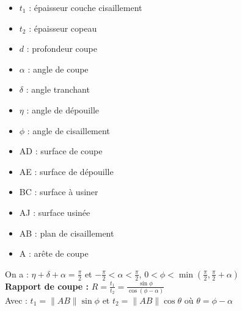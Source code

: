 \documentclass[../main.tex]{subfiles}
\begin{document}
\begin{minipage}{.5\textwidth}
    \begin{itemize}
        \item $t_1$ : épaisseur couche cisaillement\\
        \item $t_2$ : épaisseur copeau\\
        \item $d$ : profondeur coupe\\
        \item $\alpha$ : angle de coupe\\
        \item $\delta$ : angle tranchant\\
        \item $\eta$ : angle de dépouille\\
        \item $\phi$ : angle de cisaillement\\
    \end{itemize}
\end{minipage}
\begin{minipage}{.5\textwidth}
    \begin{itemize}
        \item AD : surface de coupe\\
        \item AE : surface de dépouille\\
        \item BC : surface à usiner\\
        \item AJ : surface usinée\\
        \item AB : plan de cisaillement\\
        \item A : arête de coupe\\
    \end{itemize}
\end{minipage}

On a : $\eta + \delta + \alpha = \frac{\pi}{2}$ et $-\frac{\pi}{2}<\alpha<\frac{\pi}{2}$, $0<\phi< \min(\frac{\pi}{2}, \frac{\pi}{2}+\alpha)$\\

\textbf{Rapport de coupe :} $R = \frac{t_1}{t_2} = \frac{\sin{\phi}}{\cos(\phi-\alpha)}$\\
Avec : $t_1 = \lVert AB\rVert \sin{\phi}$ et $t_2 = \lVert AB\rVert \cos{\theta}$ où $\theta = \phi-\alpha$\\
\end{document}
